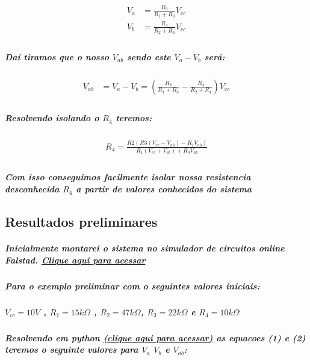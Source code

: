 \documentclass[12pt,twoside, a4paper, twocolumn]{article}
\begin{document}
\begin{equation}
    \begin{aligned}
        V_{a} & = \frac{R_3}{R_1+R_3}V_{cc} \\
        V_{b} & = \frac{R_4}{R_2+R_4}V_{cc} \\
    \end{aligned}
\end{equation}

\subparagraph*{Daí tiramos que o nosso $V_{ab}$ sendo este $V_a - V_b$ será:}

\begin{equation}
    \begin{aligned}
        V_{ab} & = V_{a} - V_{b} = \left(\frac{R_3}{R_1+R_3} - \frac{R_4}{R_2+R_4}\right)V_{cc} \\
    \end{aligned}
\end{equation}

\subparagraph*{Resolvendo isolando o $R_4$ teremos:}

\begin{equation}
    \begin{aligned}
        R_4 = \frac{R2(R3(V_{cc} - V_{ab}) - R_1V_{ab})}{R_1 (V_{cc} + V_{ab}) +R_3V_{ab}} \\
    \end{aligned}
\end{equation}

\subparagraph*{Com isso conseguimos facilmente isolar nossa resistencia desconhecida $R_4$ a partir de valores conhecidos do sistema}

\subsection{Resultados preliminares}


\subparagraph*{ Inicialmente montarei o sistema no simulador de circuitos online Falstad. \href{https://www.falstad.com/circuit/circuitjs.html?ctz=CQAgjCAMB0l3BWcMBMcUHYMGZIA4UA2ATmIxAUgoqoQFMBaMMAKADcQUAWKlPPTjxDFCUMULBUpUaAhYB3QVREhsCFMNGQFq9ZpBcuAldoBOBo-sMCwhaVwzwd18HYsCU3KC3MvPXd05+MUknRT9g7l5gs10NFTUNMAwtcEo4HUTwFLjOL1is-yUggV40DIAHXKK-LwgpFiqXWypagPrvIA}{Clique aqui para acessar}}

\subparagraph*{Para o exemplo preliminar com o seguintes valores iniciais: }
\subparagraph*{$V_{cc} = 10V$ , $R_1 = 15k\varOmega$ , $R_2 = 47k\varOmega$, $R_3 = 22k\varOmega$ e $R_4 = 10k\varOmega$}

\subparagraph*{Resolvendo em python \href{https://www.online-python.com/AkfwEsRGU9}{(clique aqui para acessar)} as equacoes (1) e (2) teremos o seguinte valores para $V_{a}$  $V_b$ e $V_{ab}$:}
\end{document}
